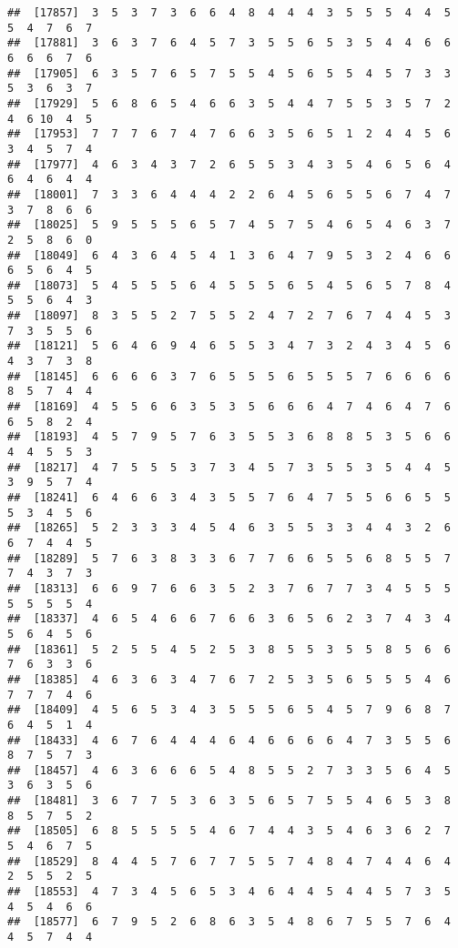 \documentclass[
]{book}
\begin{document}
\begin{verbatim}
##  [17857]  3  5  3  7  3  6  6  4  8  4  4  4  3  5  5  5  4  4  5  5  4  7  6  7
##  [17881]  3  6  3  7  6  4  5  7  3  5  5  6  5  3  5  4  4  6  6  6  6  6  7  6
##  [17905]  6  3  5  7  6  5  7  5  5  4  5  6  5  5  4  5  7  3  3  5  3  6  3  7
##  [17929]  5  6  8  6  5  4  6  6  3  5  4  4  7  5  5  3  5  7  2  4  6 10  4  5
##  [17953]  7  7  7  6  7  4  7  6  6  3  5  6  5  1  2  4  4  5  6  3  4  5  7  4
##  [17977]  4  6  3  4  3  7  2  6  5  5  3  4  3  5  4  6  5  6  4  6  4  6  4  4
##  [18001]  7  3  3  6  4  4  4  2  2  6  4  5  6  5  5  6  7  4  7  3  7  8  6  6
##  [18025]  5  9  5  5  5  6  5  7  4  5  7  5  4  6  5  4  6  3  7  2  5  8  6  0
##  [18049]  6  4  3  6  4  5  4  1  3  6  4  7  9  5  3  2  4  6  6  6  5  6  4  5
##  [18073]  5  4  5  5  5  6  4  5  5  5  6  5  4  5  6  5  7  8  4  5  5  6  4  3
##  [18097]  8  3  5  5  2  7  5  5  2  4  7  2  7  6  7  4  4  5  3  7  3  5  5  6
##  [18121]  5  6  4  6  9  4  6  5  5  3  4  7  3  2  4  3  4  5  6  4  3  7  3  8
##  [18145]  6  6  6  6  3  7  6  5  5  5  6  5  5  5  7  6  6  6  6  8  5  7  4  4
##  [18169]  4  5  5  6  6  3  5  3  5  6  6  6  4  7  4  6  4  7  6  6  5  8  2  4
##  [18193]  4  5  7  9  5  7  6  3  5  5  3  6  8  8  5  3  5  6  6  4  4  5  5  3
##  [18217]  4  7  5  5  5  3  7  3  4  5  7  3  5  5  3  5  4  4  5  3  9  5  7  4
##  [18241]  6  4  6  6  3  4  3  5  5  7  6  4  7  5  5  6  6  5  5  5  3  4  5  6
##  [18265]  5  2  3  3  3  4  5  4  6  3  5  5  3  3  4  4  3  2  6  6  7  4  4  5
##  [18289]  5  7  6  3  8  3  3  6  7  7  6  6  5  5  6  8  5  5  7  7  4  3  7  3
##  [18313]  6  6  9  7  6  6  3  5  2  3  7  6  7  7  3  4  5  5  5  5  5  5  5  4
##  [18337]  4  6  5  4  6  6  7  6  6  3  6  5  6  2  3  7  4  3  4  5  6  4  5  6
##  [18361]  5  2  5  5  4  5  2  5  3  8  5  5  3  5  5  8  5  6  6  7  6  3  3  6
##  [18385]  4  6  3  6  3  4  7  6  7  2  5  3  5  6  5  5  5  4  6  7  7  7  4  6
##  [18409]  4  5  6  5  3  4  3  5  5  5  6  5  4  5  7  9  6  8  7  6  4  5  1  4
##  [18433]  4  6  7  6  4  4  4  6  4  6  6  6  6  4  7  3  5  5  6  8  7  5  7  3
##  [18457]  4  6  3  6  6  6  5  4  8  5  5  2  7  3  3  5  6  4  5  3  6  3  5  6
##  [18481]  3  6  7  7  5  3  6  3  5  6  5  7  5  5  4  6  5  3  8  8  5  7  5  2
##  [18505]  6  8  5  5  5  5  4  6  7  4  4  3  5  4  6  3  6  2  7  5  4  6  7  5
##  [18529]  8  4  4  5  7  6  7  7  5  5  7  4  8  4  7  4  4  6  4  2  5  5  2  5
##  [18553]  4  7  3  4  5  6  5  3  4  6  4  4  5  4  4  5  7  3  5  4  5  4  6  6
##  [18577]  6  7  9  5  2  6  8  6  3  5  4  8  6  7  5  5  7  6  4  4  5  7  4  4

\end{verbatim}
\end{document}
